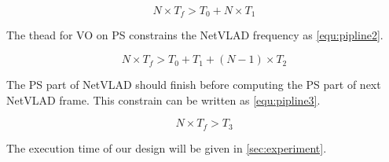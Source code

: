\begin{equation}
    N \times T_{f} > T_{0} + N \times T_{1}
    \label{equ:pipline1}
\end{equation}

The thead for VO on PS constrains the NetVLAD frequency as \cref{equ:pipline2}.

\begin{equation}
    N \times T_{f} > T_{0} + T_{1} + (N-1) \times T_{2}
    \label{equ:pipline2}
\end{equation}

The PS part of NetVLAD should finish before computing the PS part of next NetVLAD frame. This constrain can be written as \cref{equ:pipline3}.


\begin{equation}
    N \times T_{f} > T_{3}
    \label{equ:pipline3}
\end{equation}

The execution time of our design will be given in \cref{sec:experiment}.